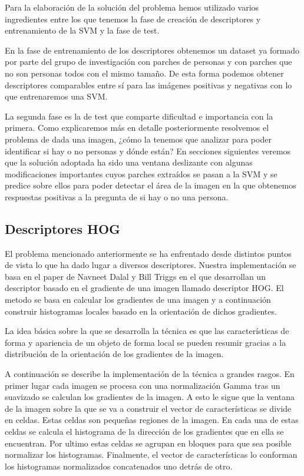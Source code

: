 \documentclass[a4paper,12pt]{article}
\begin{document}
Para la elaboración de la solución del problema hemos utilizado varios ingredientes entre los que tenemos la fase de creación de descriptores y entrenamiento de la SVM y la fase de test.

En la fase de entrenamiento de los descriptores obtenemos un dataset ya formado por parte del grupo de investigación con parches de personas y con parches que no son personas todos con el mismo tamaño. De esta forma podemos obtener descriptores comparables entre sí para las imágenes positivas y negativas con lo que entrenaremos una SVM.

La segunda fase es la de test que comparte dificultad e importancia con la primera. Como explicaremos más en detalle posteriormente resolvemos el problema de dada una imagen, ¿cómo la tenemos que analizar para poder identificar si hay o no personas y dónde están? En secciones siguientes veremos que la solución adoptada ha sido una ventana deslizante con algunas modificaciones importantes cuyos parches extraídos se pasan a la SVM y se predice sobre ellos para poder detectar el área de la imagen en la que obtenemos respuestas positivas a la pregunta de si hay o no una persona.

\subsection{Descriptores HOG}

El problema mencionado anteriormente se ha enfrentado desde
distintos puntos de vista lo que ha dado lugar a diversos
descriptores. Nuestra implementación se basa en el paper de
Navneet Dalal y Bill Triggs en el que desarrollan un descriptor
basado en el gradiente de una imagen llamado descriptor HOG.
El metodo se basa en calcular los gradientes de una imagen y a
continuación construir histogramas locales basado en la
orientación de dichos gradientes.

La idea básica sobre la que se desarrolla la técnica es que las
características de forma y apariencia de un objeto de forma local
se pueden resumir gracias a la distribución de la orientación de
los gradientes de la imagen.

A continuación se describe la implementación de la técnica a
grandes rasgos. En primer lugar cada imagen se procesa con una
normalización Gamma tras un suavizado se calculan los gradientes
de la imagen. A esto le sigue que la ventana de la imagen sobre la
que se va a construir el vector de características se divide en
celdas. Estas celdas son pequeñas regiones de la imagen. En cada
una de estas celdas se calcula el histograma de la dirección de
los gradientes que en ella se encuentran. Por ultimo estas
celdas se agrupan en bloques para que sea posible normalizar los
histogramas. Finalmente, el vector de características lo conforman
los histogramas normalizados concatenados uno detrás de otro.
\end{document}

